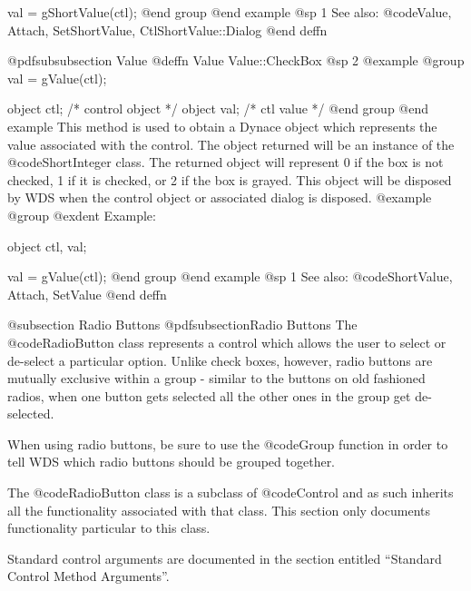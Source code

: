 val = gShortValue(ctl);
@end group
@end example
@sp 1
See also:  @code{Value, Attach, SetShortValue, CtlShortValue::Dialog}
@end deffn













@pdfsubsubsection {Value}
@deffn {Value} Value::CheckBox
@sp 2
@example
@group
val = gValue(ctl);

object  ctl;   /*  control object  */
object  val;   /*  ctl value       */
@end group
@end example
This method is used to obtain a Dynace object which represents the value
associated with the control.  The object returned will be an instance of
the @code{ShortInteger} class.  The returned object will represent 0 if
the box is not checked, 1 if it is checked, or 2 if the box is grayed.
This object will be disposed by WDS when the control object or
associated dialog is disposed.
@example
@group
@exdent Example:

object  ctl, val;

val = gValue(ctl);
@end group
@end example
@sp 1
See also:  @code{ShortValue, Attach, SetValue}
@end deffn















@subsection Radio Buttons
@pdfsubsection{Radio Buttons}
The @code{RadioButton} class represents a control which allows the user
to select or de-select a particular option.  Unlike check boxes, however,
radio buttons are mutually exclusive within a group - similar to the
buttons on old fashioned radios, when one button gets selected all the
other ones in the group get de-selected.

When using radio buttons, be sure to use the @code{Group} function in order
to tell WDS which radio buttons should be grouped together.

The @code{RadioButton} class is a subclass of @code{Control} and as such
inherits all the functionality associated with that class.  This section
only documents functionality particular to this class.

Standard control arguments are documented in the section entitled
``Standard Control Method Arguments''.






